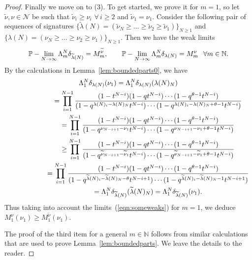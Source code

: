\documentclass[pdftex]{sigma}
\numberwithin{equation}{section}
\newcommand{\N}{\mathbb{N}}
\newcommand{\Nu}{\mathcal{N}}
\begin{document}
\begin{proof}
Finally we move on to (3). To get started, we prove it for $m = 1$, so let $\widetilde{\nu}, \nu\in\Nu$ be such that $\widetilde{\nu}_i \geq \nu_i$ $\forall \, i\geq 2$ and $\widetilde{\nu}_1 = \nu_1$. Consider the following pair of sequences of signatures $\{\widetilde{\lambda}(N) = (\widetilde{\nu}_N \geq \dots \geq \widetilde{\nu}_2 \geq \widetilde{\nu}_1) \}_{N\geq 1}$ and $\{\lambda(N) = (\nu_N \geq \dots \geq \nu_2 \geq \nu_1) \}_{N\geq 1}$. Then we have the weak limits
\begin{gather}\label{eqn:someweaks}
\mathbb{P}-\lim_{N\rightarrow\infty}{\Lambda^N_m\delta_{\widetilde{\lambda}(N)}} = M^{\widetilde{\nu}}_m, \qquad \mathbb{P}-\lim_{N\rightarrow\infty}{\Lambda^N_m\delta_{\lambda(N)}} = M^{\nu}_m \hspace{.1in}\forall m\in\N.
\end{gather}
By the calculations in Lemma~\ref{lem:boundedparts0}, we have
\begin{gather*}
\Lambda^N_1\delta_{\lambda(N)}(\nu_1)
= \Lambda^N_1\delta_{\lambda(N)}(\lambda(N)_N)\\
\hphantom{\Lambda^N_1\delta_{\lambda(N)}(\nu_1)}{}
= \prod_{i=1}^{N-1}{\frac{(1 - t^{N-i})(1 - qt^{N-i})\cdots (1 - q^{\theta - 1}t^{N-i})}{(1 - q^{\lambda(N)_i - \lambda(N)_N}t^{N-i})\cdots (1 - q^{\lambda(N)_i - \lambda(N)_N + \theta - 1}t^{N - i})}}\\
\hphantom{\Lambda^N_1\delta_{\lambda(N)}(\nu_1)}{}= \prod_{i=1}^{N-1}{\frac{(1 - t^{N-i})(1 - qt^{N-i})\cdots (1 - q^{\theta - 1}t^{N-i})}{(1 - q^{\nu_{N-i+1} - \nu_1}t^{N-i})\cdots (1 - q^{\nu_{N-i+1} - \nu_1 + \theta - 1}t^{N-i})}}\\
\hphantom{\Lambda^N_1\delta_{\lambda(N)}(\nu_1)}{}\geq \prod_{i=1}^{N-1}{\frac{(1 - t^{N-i})(1 - qt^{N-i})\cdots (1 - q^{\theta - 1}t^{N-i})}{(1 - q^{\widetilde{\nu}_{N-i+1} - \widetilde{\nu}_1}t^{N-i})\cdots (1 - q^{\widetilde{\nu}_{N-i+1} - \widetilde{\nu}_1 + \theta - 1}t^{N-i})}}\\
\hphantom{\Lambda^N_1\delta_{\lambda(N)}(\nu_1)}{}=\prod_{i=1}^{N-1}{\frac{(1 - t^{N-i})(1 - qt^{N-i})\cdots (1 - q^{\theta - 1}t^{N-i})}{(1 - q^{\widetilde{\lambda}(N)_i - \widetilde{\lambda}(N)_N - \theta}t^{N-i+1})\cdots (1 - q^{\widetilde{\lambda}(N)_i - \widetilde{\lambda}(N)_N - 1}t^{N-i+1})}}\\
\hphantom{\Lambda^N_1\delta_{\lambda(N)}(\nu_1)}{}= \Lambda^N_1\delta_{\widetilde{\lambda}(N)}(\widetilde{\lambda}(N)_N) = \Lambda^N_1\delta_{\widetilde{\lambda}(N)}(\nu_1).
\end{gather*}
Thus taking into account the limits~(\ref{eqn:someweaks}) for $m = 1$, we deduce $M^{\nu}_1(\nu_1) \geq M^{\widetilde{\nu}}_1(\nu_1)$.

The proof of the third item for a general $m\in\N$ follows from similar calculations that are used to prove Lemma~\ref{lem:boundedparts}. We leave the details to the reader.
\end{proof}
\end{document}
